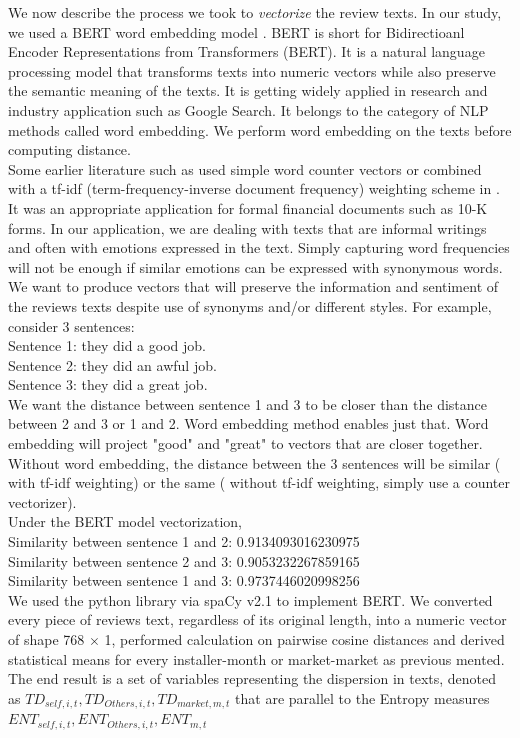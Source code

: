 \documentclass[msom,blindrev]{informs3}
\begin{document}
We now describe the process we took to \textit{vectorize} the review texts. In our study, we used a BERT word embedding model \citep{devlin2018bert}. BERT is short for Bidirectioanl Encoder Representations from Transformers (BERT). It is a natural language processing model that transforms texts into numeric vectors while also preserve the semantic meaning of the texts. It is getting widely applied in research and industry application such as Google Search. It belongs to the category of NLP methods called word embedding. We perform word embedding on the texts before computing distance. \\
Some earlier literature such as \cite{hoberg2016text} used simple word counter vectors or combined with a tf-idf (term-frequency-inverse document frequency) weighting scheme in \cite{loughran2011liability}. It was an appropriate application for formal financial documents such as 10-K forms. In our application, we are dealing with texts that are informal writings and often with emotions expressed in the text. Simply capturing word frequencies will not be enough if similar emotions can be expressed with synonymous words. We want to produce vectors that will preserve the information and sentiment of the reviews texts despite use of synonyms and/or different styles. For example, consider 3 sentences: \\
Sentence 1: they did a good job. \\
Sentence 2: they did an awful job. \\
Sentence 3: they did a great job. \\ 
We want the distance between sentence 1 and 3 to be closer than the distance between 2 and 3 or 1 and 2. Word embedding method enables just that. Word embedding will project "good" and "great" to vectors that are closer together. Without word embedding, the distance between the 3 sentences will be similar ( with tf-idf weighting) or the same ( without tf-idf weighting, simply use a counter vectorizer). \\
Under the BERT model vectorization, \\
Similarity between sentence 1 and 2: 0.9134093016230975\\
Similarity between sentence 2 and 3: 0.9053232267859165\\
Similarity between sentence 1 and 3: 0.9737446020998256\\ 

We used the python library via spaCy v2.1 to implement BERT. We converted every piece of reviews text, regardless of its original length, into a numeric vector of shape 768 $\times$ 1,  performed calculation on pairwise cosine distances and derived statistical means for every installer-month or market-market as previous mented. The end result is a set of variables representing the dispersion in texts, denoted as $TD_{self,i,t},TD_{Others,i,t},TD_{market,m,t}$ that are parallel to the Entropy measures $ENT_{self,i,t},ENT_{Others,i,t},ENT_{m,t}$ \\ 
\end{document}
